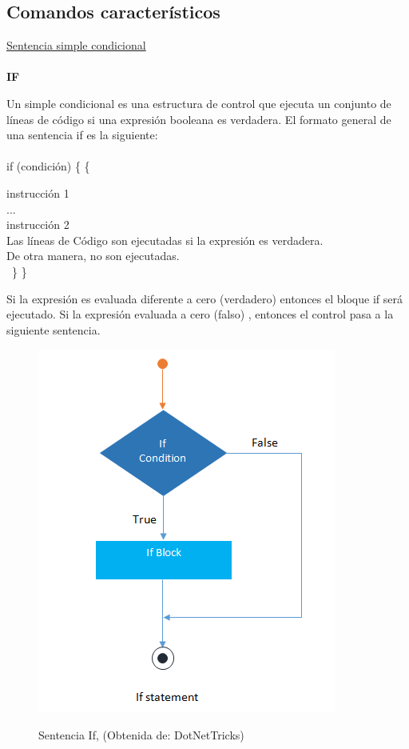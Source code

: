 \documentclass[11pt, letterpaper, spanish]{article}
\begin{document}
{{{\subsection{Comandos característicos}
    \vspace{1 cm}
    \underline{Sentencia simple condicional}
   \\
    \\
    \textbf{IF}
\par{Un simple condicional es una estructura de control que ejecuta un conjunto de líneas de código si una expresión booleana es verdadera. El formato general de una sentencia if es la siguiente}:
    \\
    \\
    if (condición)
    \{ \{
     
     instrucción 1
     \\
     ...
     \\
     instrucción 2
    \\
Las líneas de Código son ejecutadas si la expresión es verdadera.
     \\
 De otra manera, no son ejecutadas.
     \\
\
\}
\}
\\
\par{Si la expresión es evaluada diferente a cero (verdadero) entonces el bloque if será ejecutado. Si la expresión evaluada a cero (falso) , entonces el control pasa a la siguiente sentencia.}
\\
\begin{figure}
	    \centering
		\caption{Sentencia If, (Obtenida de: {DotNetTricks})}
		\includegraphics[width=0.2 \textwidth]{ifstatement.png}
		\label{Imagen_if}
	\end{figure}
 
}}}
\end{document}
